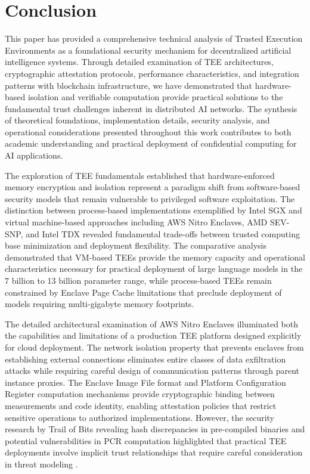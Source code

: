 \section{Conclusion}

This paper has provided a comprehensive technical analysis of Trusted Execution Environments as a foundational security mechanism for decentralized artificial intelligence systems. Through detailed examination of TEE architectures, cryptographic attestation protocols, performance characteristics, and integration patterns with blockchain infrastructure, we have demonstrated that hardware-based isolation and verifiable computation provide practical solutions to the fundamental trust challenges inherent in distributed AI networks. The synthesis of theoretical foundations, implementation details, security analysis, and operational considerations presented throughout this work contributes to both academic understanding and practical deployment of confidential computing for AI applications.

The exploration of TEE fundamentals established that hardware-enforced memory encryption and isolation represent a paradigm shift from software-based security models that remain vulnerable to privileged software exploitation. The distinction between process-based implementations exemplified by Intel SGX and virtual machine-based approaches including AWS Nitro Enclaves, AMD SEV-SNP, and Intel TDX revealed fundamental trade-offs between trusted computing base minimization and deployment flexibility. The comparative analysis demonstrated that VM-based TEEs provide the memory capacity and operational characteristics necessary for practical deployment of large language models in the 7 billion to 13 billion parameter range, while process-based TEEs remain constrained by Enclave Page Cache limitations that preclude deployment of models requiring multi-gigabyte memory footprints.

The detailed architectural examination of AWS Nitro Enclaves illuminated both the capabilities and limitations of a production TEE platform designed explicitly for cloud deployment. The network isolation property that prevents enclaves from establishing external connections eliminates entire classes of data exfiltration attacks while requiring careful design of communication patterns through parent instance proxies. The Enclave Image File format and Platform Configuration Register computation mechanisms provide cryptographic binding between measurements and code identity, enabling attestation policies that restrict sensitive operations to authorized implementations. However, the security research by Trail of Bits revealing hash discrepancies in pre-compiled binaries and potential vulnerabilities in PCR computation highlighted that practical TEE deployments involve implicit trust relationships that require careful consideration in threat modeling \cite{trail_of_bits_nitro}.


